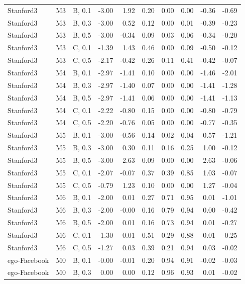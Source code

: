 \begin{longtable}{lllrrrrrrr}
Stanford3 & M3 & B, 0.1 & -3.00 & 1.92 & 0.20 & 0.00 & 0.00 & -0.36 & -0.69 \\
Stanford3 & M3 & B, 0.3 & -3.00 & 0.52 & 0.12 & 0.00 & 0.01 & -0.39 & -0.23 \\
Stanford3 & M3 & B, 0.5 & -3.00 & -0.34 & 0.09 & 0.03 & 0.06 & -0.34 & -0.20 \\
Stanford3 & M3 & C, 0.1 & -1.39 & 1.43 & 0.46 & 0.00 & 0.09 & -0.50 & -0.12 \\
Stanford3 & M3 & C, 0.5 & -2.17 & -0.42 & 0.26 & 0.11 & 0.41 & -0.42 & -0.07 \\
Stanford3 & M4 & B, 0.1 & -2.97 & -1.41 & 0.10 & 0.00 & 0.00 & -1.46 & -2.01 \\
Stanford3 & M4 & B, 0.3 & -2.97 & -1.40 & 0.07 & 0.00 & 0.00 & -1.41 & -1.28 \\
Stanford3 & M4 & B, 0.5 & -2.97 & -1.41 & 0.06 & 0.00 & 0.00 & -1.41 & -1.13 \\
Stanford3 & M4 & C, 0.1 & -2.22 & -0.80 & 0.15 & 0.00 & 0.00 & -0.80 & -0.79 \\
Stanford3 & M4 & C, 0.5 & -2.20 & -0.76 & 0.05 & 0.00 & 0.00 & -0.77 & -0.35 \\
Stanford3 & M5 & B, 0.1 & -3.00 & -0.56 & 0.14 & 0.02 & 0.04 & 0.57 & -1.21 \\
Stanford3 & M5 & B, 0.3 & -3.00 & 0.30 & 0.11 & 0.16 & 0.25 & 1.00 & -0.12 \\
Stanford3 & M5 & B, 0.5 & -3.00 & 2.63 & 0.09 & 0.00 & 0.00 & 2.63 & -0.06 \\
Stanford3 & M5 & C, 0.1 & -2.07 & -0.07 & 0.37 & 0.39 & 0.85 & 1.03 & -0.07 \\
Stanford3 & M5 & C, 0.5 & -0.79 & 1.23 & 0.10 & 0.00 & 0.00 & 1.27 & -0.04 \\
Stanford3 & M6 & B, 0.1 & -2.00 & 0.01 & 0.27 & 0.71 & 0.95 & 0.01 & -1.01 \\
Stanford3 & M6 & B, 0.3 & -2.00 & -0.00 & 0.16 & 0.79 & 0.94 & 0.00 & -0.42 \\
Stanford3 & M6 & B, 0.5 & -2.00 & 0.01 & 0.16 & 0.73 & 0.94 & 0.01 & -0.27 \\
Stanford3 & M6 & C, 0.1 & -1.30 & -0.01 & 0.51 & 0.29 & 0.88 & -0.01 & -0.25 \\
Stanford3 & M6 & C, 0.5 & -1.27 & 0.03 & 0.39 & 0.21 & 0.94 & 0.03 & -0.02 \\
ego-Facebook & M0 & B, 0.1 & -0.00 & -0.01 & 0.20 & 0.94 & 0.91 & -0.02 & -0.03 \\
ego-Facebook & M0 & B, 0.3 & 0.00 & 0.00 & 0.12 & 0.96 & 0.93 & 0.01 & -0.02 \\

\end{longtable}
